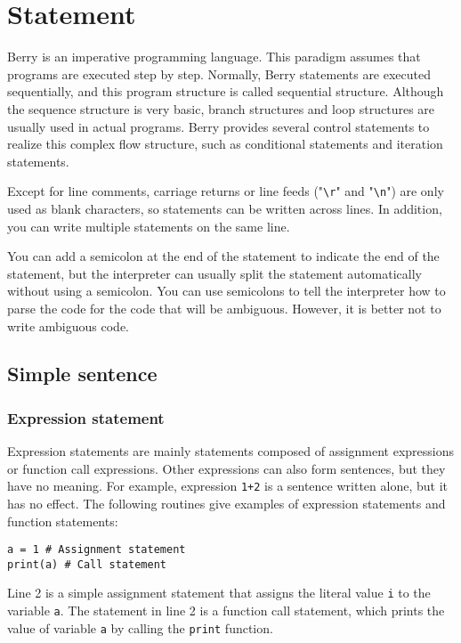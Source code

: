 \chapter {Statement}

Berry is an imperative programming language. This paradigm assumes that programs are executed step by step. Normally, Berry statements are executed sequentially, and this program structure is called sequential structure. Although the sequence structure is very basic, branch structures and loop structures are usually used in actual programs. Berry provides several control statements to realize this complex flow structure, such as conditional statements and iteration statements.

Except for line comments, carriage returns or line feeds ("\texttt{\textbackslash r}" and "\texttt{\textbackslash n}") are only used as blank characters, so statements can be written across lines. In addition, you can write multiple statements on the same line.

You can add a semicolon at the end of the statement to indicate the end of the statement, but the interpreter can usually split the statement automatically without using a semicolon. You can use semicolons to tell the interpreter how to parse the code for the code that will be ambiguous. However, it is better not to write ambiguous code.

\section {Simple sentence}

\subsection {Expression statement}

Expression statements are mainly statements composed of assignment expressions or function call expressions. Other expressions can also form sentences, but they have no meaning. For example, expression \texttt{1+2} is a sentence written alone, but it has no effect. The following routines give examples of expression statements and function statements:
\begin{lstlisting}[language=berry, numbers=none]
a = 1 # Assignment statement
print(a) # Call statement
\end{lstlisting}
Line 2 is a simple assignment statement that assigns the literal value \texttt{i} to the variable \texttt{a}. The statement in line 2 is a function call statement, which prints the value of variable \texttt{a} by calling the \texttt{print} function.

